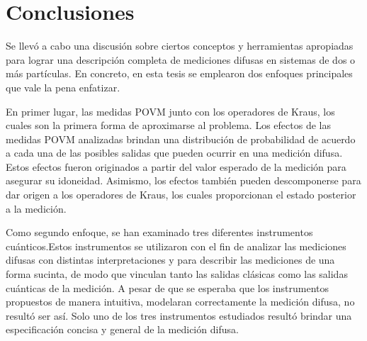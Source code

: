 \documentclass[12pt,letterpaper]{book}\raggedbottom{}
\begin{document}
\section{Conclusiones}

Se llevó a cabo una discusión sobre ciertos conceptos y herramientas apropiadas para lograr una descripción completa de mediciones difusas en sistemas
de dos o más partículas. En concreto, en esta tesis se emplearon dos enfoques
principales que vale la pena enfatizar.


En primer lugar, las medidas POVM junto con los operadores de Kraus, los cuales
son la primera forma de aproximarse al problema. Los efectos de las medidas
POVM  analizadas brindan una distribución de probabilidad de acuerdo a cada una
de las posibles salidas que pueden ocurrir en una medición difusa. Estos
efectos fueron originados a partir del valor esperado de la medición para
asegurar su idoneidad.  Asimismo, los efectos también pueden descomponerse
para dar origen a los operadores de Kraus, los cuales proporcionan el estado
posterior a la medición.

Como segundo enfoque, se han examinado tres diferentes instrumentos cuánticos.Estos instrumentos se utilizaron con el fin de analizar las mediciones difusas con distintas interpretaciones y para describir las mediciones de una forma sucinta, de modo que vinculan tanto las salidas clásicas como las salidas cuánticas de la medición. A pesar de que se esperaba que los instrumentos propuestos de manera intuitiva, modelaran correctamente la medición difusa, no resultó ser así. Solo uno de los tres instrumentos estudiados resultó brindar una especificación concisa y general de la medición difusa.
\end{document}
